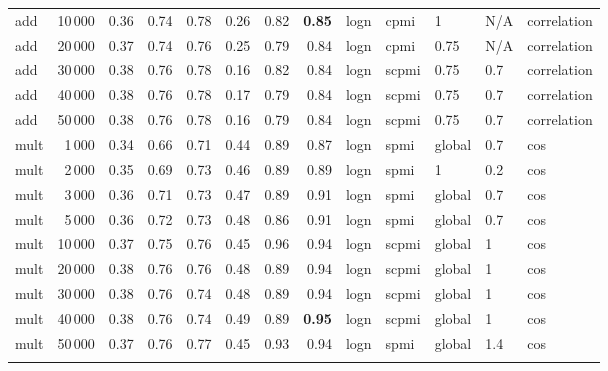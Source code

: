 \begin{tabular}{lrrrrrrrlllll}
     add &           10\,000 &       0.36 &  0.74 &  0.78 &  0.26 &       0.82 &       \textbf{0.85} &  logn &   cpmi &       1 &  N/A &    correlation \\
     add &           20\,000 &       0.37 &  0.74 &  0.76 &  0.25 &       0.79 &       0.84 &  logn &   cpmi &    0.75 &  N/A &    correlation \\
     add &           30\,000 &       0.38 &  0.76 &  0.78 &  0.16 &       0.82 &       0.84 &  logn &  scpmi &    0.75 &  0.7 &    correlation \\
     add &           40\,000 &       0.38 &  0.76 &  0.78 &  0.17 &       0.79 &       0.84 &  logn &  scpmi &    0.75 &  0.7 &    correlation \\
     add &           50\,000 &       0.38 &  0.76 &  0.78 &  0.16 &       0.79 &       0.84 &  logn &  scpmi &    0.75 &  0.7 &    correlation \\ \addlinespace
    mult &            1\,000 &       0.34 &  0.66 &  0.71 &  0.44 &       0.89 &       0.87 &  logn &   spmi &  global &  0.7 &            cos \\
    mult &            2\,000 &       0.35 &  0.69 &  0.73 &  0.46 &       0.89 &       0.89 &  logn &   spmi &       1 &  0.2 &            cos \\
    mult &            3\,000 &       0.36 &  0.71 &  0.73 &  0.47 &       0.89 &       0.91 &  logn &   spmi &  global &  0.7 &            cos \\
    mult &            5\,000 &       0.36 &  0.72 &  0.73 &  0.48 &       0.86 &       0.91 &  logn &   spmi &  global &  0.7 &            cos \\
    mult &           10\,000 &       0.37 &  0.75 &  0.76 &  0.45 &       0.96 &       0.94 &  logn &  scpmi &  global &    1 &            cos \\
    mult &           20\,000 &       0.38 &  0.76 &  0.76 &  0.48 &       0.89 &       0.94 &  logn &  scpmi &  global &    1 &            cos \\
    mult &           30\,000 &       0.38 &  0.76 &  0.74 &  0.48 &       0.89 &       0.94 &  logn &  scpmi &  global &    1 &            cos \\
    mult &           40\,000 &       0.38 &  0.76 &  0.74 &  0.49 &       0.89 &       \textbf{0.95} &  logn &  scpmi &  global &    1 &            cos \\
    mult &           50\,000 &       0.37 &  0.76 &  0.77 &  0.45 &       0.93 &       0.94 &  logn &   spmi &  global &  1.4 &            cos \\ \addlinespace

\end{tabular}
